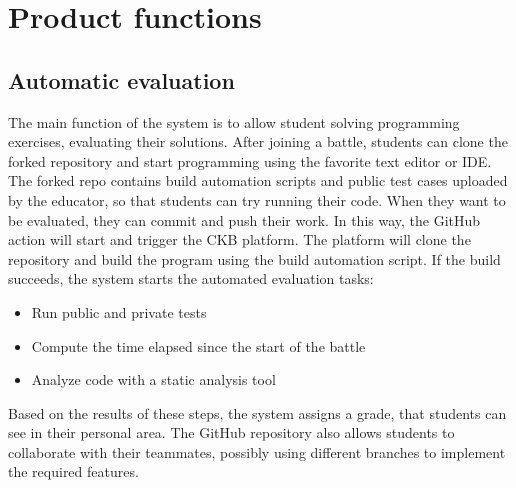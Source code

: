 \section{Product functions}
\subsection{Automatic evaluation}
The main function of the system is to allow student solving programming exercises, evaluating their solutions.
After joining a battle, students can clone the forked repository and start programming using the favorite text editor or IDE.
The forked repo contains build automation scripts and public test cases uploaded by the educator, so that students can try running their code.
When they want to be evaluated, they can commit and push their work. In this way, the GitHub action will start and trigger the CKB platform.
The platform will clone the repository and build the program using the build automation script.
If the build succeeds, the system starts the automated evaluation tasks:
\begin{itemize}
	\item Run public and private tests
	\item Compute the time elapsed since the start of the battle
	\item Analyze code with a static analysis tool
\end{itemize}
Based on the results of these steps, the system assigns a grade, that students can see in their personal area.
The GitHub repository also allows students to collaborate with their teammates, possibly using different branches to implement the required features.
\begin{adjustbox}{
		max size={\textwidth}{},
		center,
		caption={Automatic evaluation activity diagram},
		label={fig:Automatic evaluation activity diagram},
		figure=H}
\end{adjustbox}

\pagebreak

